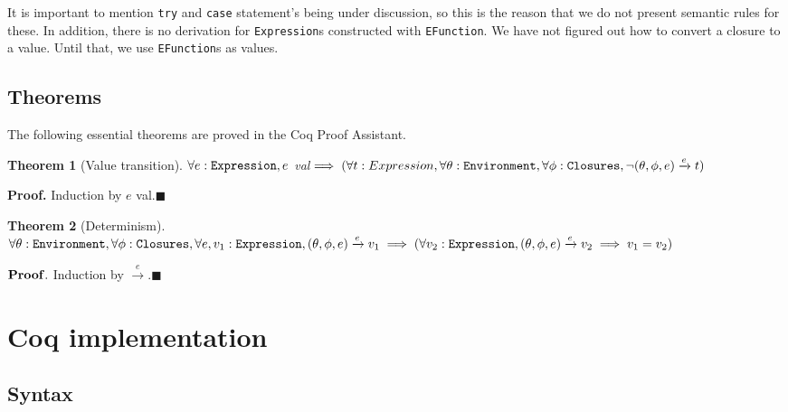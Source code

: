 \documentclass[12pt]{article}
\newtheorem{thm}{Theorem}[section]
\theoremstyle{definition}
\newcommand{\ose}{\xrightarrow{e}}
\numberwithin{equation}{section}
\begin{document}
It is important to mention \verb|try| and \verb|case| statement's being under discussion, so this is the reason that we do not present semantic rules for these. In addition, there is no derivation for \verb|Expression|s constructed with \verb|EFunction|. We have not figured out how to convert a closure to a value. Until that, we use \verb|EFunction|s as values.



\subsection{Theorems}

The following essential theorems are proved in the Coq Proof Assistant.

\begin{thm}[Value transition]
	\label{P:valtrans}
	$\forall e : \verb|Expression|, e$ val$\implies (\forall t : Expression, \forall \theta : \verb|Environment|, \forall \phi : \verb|Closures|, \neg (\theta,\phi,e) \ose t)$
\end{thm}
\noindent
{\bf Proof.} Induction by $e$ val.$\blacksquare$



\begin{thm}[Determinism]
	\label{P:det}
	$\forall \theta : \verb|Environment|, \forall \phi : \verb|Closures|, \forall e, v_1 : \verb|Expression|, \\
	 (\theta, \phi, e) \ose v_1 \implies (\forall v_2 : \verb|Expression|, (\theta, \phi, e) \ose v_2 \implies v_1 = v_2)$	
\end{thm}
\noindent
${\bf Proof.}$ Induction by $\ose$.$\blacksquare$

\section{Coq implementation}

\subsection{Syntax}
\end{document}
